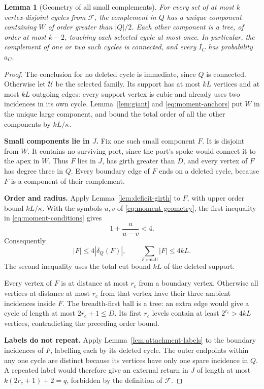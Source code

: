 \documentclass[11pt,a4paper]{article}
\numberwithin{equation}{section}
\newtheorem{lemma}[theorem]{Lemma}
\theoremstyle{definition}
\theoremstyle{remark}
\newcommand{\proofstep}[1]{\par\addvspace{\medskipamount}\noindent\textbf{#1}\enspace\ignorespaces}
\begin{document}
\begin{lemma}[Geometry of all small complements]\label{lem:small-trees}
For every set of at most $k$ vertex-disjoint cycles from $\mathcal F$, the complement in $Q$ has a unique component containing $W$ of order greater than $|Q|/2$. Each other component is a tree, of order at most $k-2$, touching each selected cycle at most once. In particular, the complement of one or two such cycles is connected, and every $I_C$ has probability $a_C$.
\end{lemma}
\begin{proof}
The conclusion for no deleted cycle is immediate, since $Q$ is connected. Otherwise let $\mathcal U$ be the selected family. Its support has at most $kL$ vertices and at most $kL$ outgoing edges: every support vertex is cubic and already uses two incidences in its own cycle. Lemma~\ref{lem:giant} and \eqref{eq:moment-anchors} put $W$ in the unique large component, and bound the total order of all the other components by $kL/\kappa$.

\proofstep{Small components lie in $J$.}
Fix one such small component $F$. It is disjoint from $W$. It contains no surviving port, since the port's spoke would connect it to the apex in $W$. Thus $F$ lies in $J$, has girth greater than $D$, and every vertex of $F$ has degree three in $Q$. Every boundary edge of $F$ ends on a deleted cycle, because $F$ is a component of their complement.

\proofstep{Order and radius.}
Apply Lemma~\ref{lem:deficit-girth} to $F$, with upper order bound $kL/\kappa$. With the symbols $u,v$ of \eqref{eq:moment-geometry}, the first inequality in \eqref{eq:moment-conditions} gives
\[
 1+\frac{u}{u-v}<4.
\]
Consequently
\[
 |F|\le4|\delta_Q(F)|,
 \qquad
 \sum_{F\text{ small}}|F|\le4kL.
\]
The second inequality uses the total cut bound $kL$ of the deleted support.

Every vertex of $F$ is at distance at most $r_c$ from a boundary vertex. Otherwise all vertices at distance at most $r_c$ from that vertex have their three ambient incidences inside $F$. The breadth-first ball is a tree: an extra edge would give a cycle of length at most $2r_c+1\le D$. Its first $r_c$ levels contain at least $2^{r_c}>4kL$ vertices, contradicting the preceding order bound.

\proofstep{Labels do not repeat.}
Apply Lemma~\ref{lem:attachment-labels} to the boundary incidences of $F$, labelling each by its deleted cycle. The outer endpoints within any one cycle are distinct because its vertices have only one spare incidence in $Q$. A repeated label would therefore give an external return in $J$ of length at most $k(2r_c+1)+2=q$, forbidden by the definition of $\mathcal F$.


\end{proof}
\end{document}
